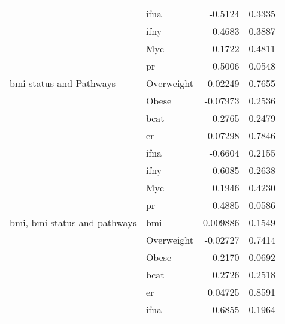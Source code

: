 \begin{table}[htpb]
\begin{threeparttable}
\begin{tabular}{llrc}
                                                                           & \gls{ifna} & -0.5124    & 0.3335 \\
                                                                           & \gls{ifny} & 0.4683     & 0.3887 \\
                                                                           & Myc        & 0.1722     & 0.4811 \\
                                                                           & \gls{pr}   & 0.5006     & 0.0548 \\
				\hline
				\rule{0pt}{2.25ex}\gls{bmi} status and Pathways            & Overweight & 0.02249    & 0.7655 \\
                                                                           & Obese      & -0.07973   & 0.2536 \\
                                                                           & \gls{bcat} & 0.2765     & 0.2479 \\
                                                                           & \gls{er}   & 0.07298    & 0.7846 \\
                                                                           & \gls{ifna} & -0.6604    & 0.2155 \\
                                                                           & \gls{ifny} & 0.6085     & 0.2638 \\
                                                                           & Myc        & 0.1946     & 0.4230 \\
                                                                           & \gls{pr}   & 0.4885     & 0.0586 \\
				\hline
				\rule{0pt}{2.25ex}\gls{bmi}, \gls{bmi} status and pathways & \gls{bmi}  & 0.009886   & 0.1549 \\
                                                                           & Overweight & -0.02727   & 0.7414 \\
                                                                           & Obese      & -0.2170    & 0.0692 \\
                                                                           & \gls{bcat} & 0.2726     & 0.2518 \\
                                                                           & \gls{er}   & 0.04725    & 0.8591 \\
                                                                           & \gls{ifna} & -0.6855    & 0.1964 \\

\end{tabular}
\end{threeparttable}
\end{table}
